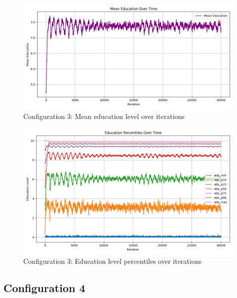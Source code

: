 \documentclass[english]{projectreport}
\begin{document}
    \begin{figure}[H]
        \centering
        \includegraphics[width=0.8\linewidth]{metrics_config3/metrics_config3_mean_education.png}
        \caption{Configuration 3: Mean education level over iterations}
        \label{fig:c0-mean_education}
    \end{figure}

    \begin{figure}[H]
        \centering
        \includegraphics[width=0.8\linewidth]{metrics_config3/metrics_config3_education_perc_time.png}
        \caption{Configuration 3: Education level percentiles over iterations}
        \label{fig:c0-education_perc_time}
    \end{figure}

\subsection*{Configuration 4}
\end{document}
